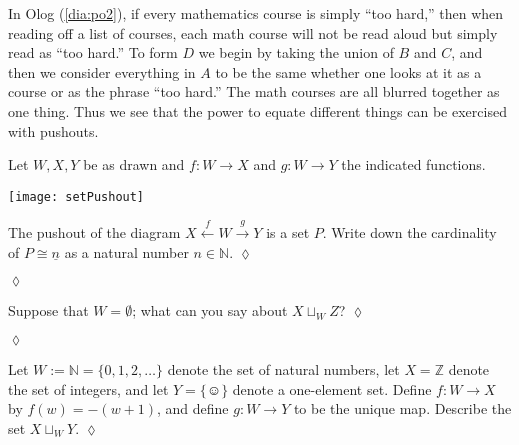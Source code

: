 \documentclass[a4paper]{book}
\def\ZZ{{\mathbb Z}}
\def\NN{{\mathbb N}}
\def\singleton{\{\smiley\}}
\def\to{\rightarrow}
\def\taking{\colon}
\def\iso{\cong}
\def\ul{\underline}
\newcommand{\Too}[1]{\xrightarrow{\ \ #1\ \ }}
\newcommand{\Fromm}[1]{\xleftarrow{\ \ #1\ \ }}
\theoremstyle{myth}
\newtheorem{exampleENG}[envENG]{\begin{english}Example\end{english}}
\newtheorem{excENG}[envENG]{\begin{english}Exercise\end{english}}
\newenvironment{exerciseENG}{\begin{excENG}}{\hspace*{\fill}$\lozenge$\end{excENG}}
\newtheorem{exampleRUS}[envRUS]{\begin{russian}Пример\end{russian}}
\newtheorem{excRUS}[envRUS]{\begin{russian}Упражнение\end{russian}}
\newenvironment{exerciseRUS}{\begin{excRUS}}{\hspace*{\fill}$\lozenge$\end{excRUS}}
\begin{document}
\begin{english}
\begin{exampleENG}[Pushout]
In Olog (\ref{dia:po2}), if every mathematics course is simply “too hard,” then when reading off a list of courses, each math course will not be read aloud but simply read as “too hard.”  To form $D$ we begin by taking the union of $B$ and $C$, and then we consider everything in $A$ to be the same whether one looks at it as a course or as the phrase “too hard.”  The math courses are all blurred together as one thing.  Thus we see that the power to equate different things can be exercised with pushouts.
\end{exampleENG}

\begin{exampleRUS}\label{ex:pushout}
\begin{russian} \end{russian}
\end{exampleRUS}

\begin{exerciseENG}
Let $W,X,Y$ be as drawn and $f\taking W\to X$ and $g\taking W\to Y$ the indicated functions. 
\begin{center}
\texttt{[image: setPushout]}
\end{center}
The pushout of the diagram $X\Fromm{f}W\Too{g}Y$ is a set $P$. Write down the cardinality of $P\iso\ul{n}$ as a natural number $n\in\NN$.  
\end{exerciseENG}

\begin{exerciseRUS}
\begin{russian} \end{russian}
\end{exerciseRUS}

\begin{exerciseENG}
Suppose that $W=\emptyset$; what can you say about $X\sqcup_WZ$? 
\end{exerciseENG}

\begin{exerciseRUS}
\begin{russian} \end{russian}
\end{exerciseRUS}

\begin{exerciseENG}
Let $W:=\NN=\{0,1,2,\ldots\}$ denote the set of natural numbers, let $X=\ZZ$ denote the set of integers, and let $Y=\singleton$ denote a one-element set. Define $f\taking W\to X$ by $f(w)= -(w+1)$, and define $g\taking W\to Y$ to be the unique map. Describe the set $X\sqcup_WY$.
\end{exerciseENG}


\end{english}
\end{document}
